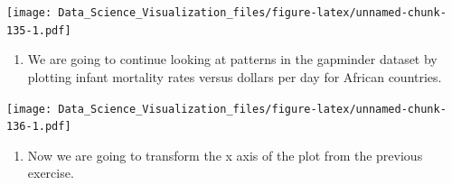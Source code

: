 \documentclass[
]{article}
\newenvironment{Shaded}{\begin{snugshade}}{\end{snugshade}}
\newcommand{\CommentTok}[1]{\textcolor[rgb]{0.56,0.35,0.01}{\textit{#1}}}
\newcommand{\DataTypeTok}[1]{\textcolor[rgb]{0.13,0.29,0.53}{#1}}
\newcommand{\DecValTok}[1]{\textcolor[rgb]{0.00,0.00,0.81}{#1}}
\newcommand{\KeywordTok}[1]{\textcolor[rgb]{0.13,0.29,0.53}{\textbf{#1}}}
\newcommand{\NormalTok}[1]{#1}
\newcommand{\OperatorTok}[1]{\textcolor[rgb]{0.81,0.36,0.00}{\textbf{#1}}}
\newcommand{\StringTok}[1]{\textcolor[rgb]{0.31,0.60,0.02}{#1}}
\providecommand{\tightlist}{%
  \setlength{\itemsep}{0pt}\setlength{\parskip}{0pt}}
\begin{document}
\texttt{[image: Data\_Science\_Visualization\_files/figure-latex/unnamed-chunk-135-1.pdf]}

\begin{enumerate}
\def\labelenumi{\arabic{enumi}.}
\setcounter{enumi}{10}
\tightlist
\item
  We are going to continue looking at patterns in the gapminder dataset
  by plotting infant mortality rates versus dollars per day for African
  countries.
\end{enumerate}

\begin{Shaded}
\end{Shaded}

\texttt{[image: Data\_Science\_Visualization\_files/figure-latex/unnamed-chunk-136-1.pdf]}

\begin{enumerate}
\def\labelenumi{\arabic{enumi}.}
\setcounter{enumi}{11}
\tightlist
\item
  Now we are going to transform the x axis of the plot from the previous
  exercise.
\end{enumerate}

\begin{Shaded}
\end{Shaded}
\end{document}
